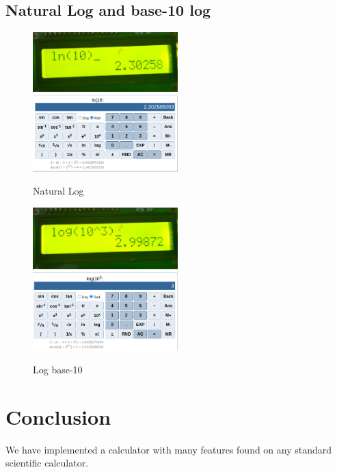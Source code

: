 \documentclass[a4paper,12pt]{article}
\begin{document}
\subsection{Natural Log and base-10 log}
\begin{figure}[H]
    \centering
    {\includegraphics[width=0.5\textwidth]{figs/ln1.jpeg}}
     \hfill
    {\includegraphics[width=0.5\textwidth]{figs/LN_VERIFY.png}}
    \caption{Natural Log}
\end{figure}
\begin{figure}[H]
    \centering
    {\includegraphics[width=0.5\textwidth]{figs/log1.jpeg}}
     \hfill
    {\includegraphics[width=0.5\textwidth]{figs/LOG_VERIFY.png}}
    \caption{Log base-10}
    \label{fig:enter-label}
\end{figure}

\section{Conclusion}
We have implemented a calculator with many features found on any standard scientific calculator.
\end{document}
